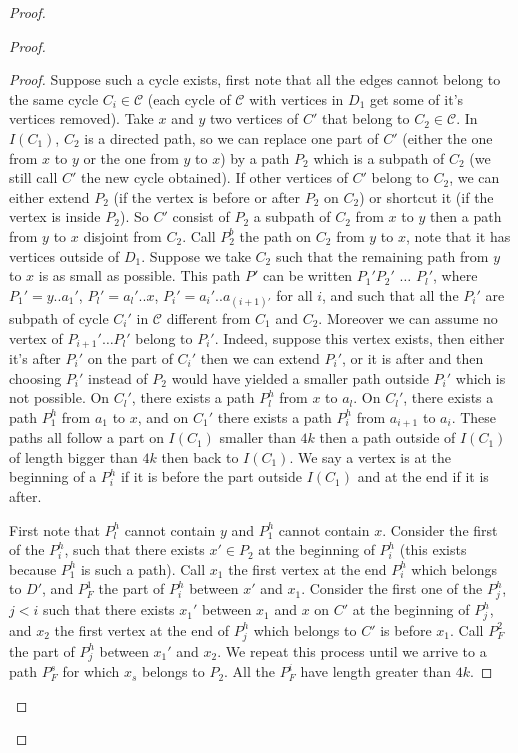 \documentclass[10pt]{article}
\theoremstyle{plain}
\theoremstyle{definition}
\theoremstyle{remark}
\begin{document}
\begin{proof}
\begin{proof}
\begin{proof}
Suppose such a cycle exists, first note that all the edges cannot belong to the same cycle $C_i \in \mathcal{C}$
(each cycle of $\mathcal{C}$ with vertices in $D_1$ get some of it's vertices removed).
Take $x$ and $y$ two vertices of $C'$ that belong to $C_2 \in \mathcal{C}$. In $I(C_1)$, $C_2$ is a directed path, 
so we can replace one part of $C'$ (either the one from $x$ to $y$ or the one from $y$ to $x$) by a path $P_2$
 which is a subpath of $C_2$ (we still call $C'$ the new cycle obtained). 
If other vertices of $C'$ belong to $C_2$, we can either extend 
$P_2$ (if the vertex is before or after $P_2$ on $C_2$)
or shortcut it (if the vertex is inside $P_2$). So $C'$ consist of $P_2$ a subpath of 
$C_2$ from $x$ to $y$ then a path from $y$ to $x$ disjoint from $C_2$.
Call $P_2^b$ the path on $C_2$ from $y$ to $x$, note that it has vertices outside of $D_1$. 
Suppose we take $C_2$ such that the remaining path from $y$ to $x$ is as small as possible. 
This path $P'$ can be written $P_1'P_2'$ $\dots$ $P_l'$, where $P_1' = y..a_1'$, 
$P_l' = a_l' ..x$, $P_i' = a_i'..a_{(i+1)'}$ for all $i$, and such that all 
the $P_i'$ are subpath of cycle $C_i'$ in $\mathcal{C}$ different from $C_1$ and $C_2$. 
Moreover we can assume no vertex of $P_{i+1}' \dots P_l'$ belong to $P_i'$. Indeed, suppose this vertex
exists, then either it's after $P_i'$ on the part of $C_i'$ then we can extend $P_i'$, or it is after and then
choosing $P_i'$ instead of $P_2$ would have yielded a smaller path outside $P_i'$ which is not possible.
On $C_l'$, there exists a path $P_l^h$ from $x$ to $a_l$. On $C_l'$, there exists a path $P_1^h$ from $a_1$ to $x$, and
on $C_1'$ there exists a path $P_i^h$ from $a_{i+1}$ to $a_i$. These paths all follow a part
on $I(C_1)$ smaller than $4k$ then a path outside of $I(C_1)$ of length bigger than 
$4k$ then back to $I(C_1)$. We say a vertex is at the beginning of a $P_i^h$ if it is 
before the part outside $I(C_1)$ and at the end if it is after.

First note that $P_l^h$ cannot contain $y$ and $P_1^h$ cannot contain $x$.
Consider the first of the $P_i^h$, such that there exists $x' \in P_2$ at the beginning of $P_i^h$
(this exists because $P_1^h$ is such a path). Call $x_1$ the first vertex at the end $P_i^h$ which belongs to 
$D'$, and $P_F^1$ the part of $P_i^h$ between $x'$ and $x_1$. 
Consider the first one of the $P_j^h$, $j<i$ such that there exists $x_1'$ between $x_1$ and $x$ on
$C'$ at the beginning of $P_j^h$, and $x_2$ the first vertex at the end of $P_j^h$ which belongs to $C'$ is before $x_1$.
Call $P_F^2$ the part of $P_j^h$ between $x_1'$ and $x_2$. 
We repeat this process until we arrive to a path $P_F^s$ for which $x_s$ belongs to $P_2$. 
All the $P_F^i$ have length greater than $4k$.


\end{proof}
\end{proof}
\end{proof}
\end{document}
